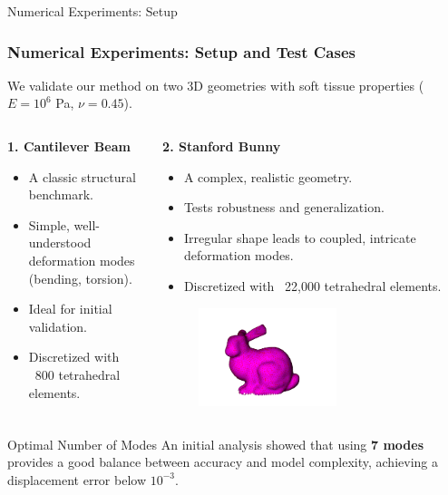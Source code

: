 \documentclass{beamer}
\begin{document}
\begin{frame}{Numerical Experiments: Setup}
    \frametitle{Numerical Experiments: Setup and Test Cases}
    
    We validate our method on two 3D geometries with soft tissue properties ($E = 10^6$ Pa, $\nu = 0.45$).
    
    \begin{columns}[T]
        \begin{column}{0.45\textwidth}
            \textbf{1. Cantilever Beam}
            \begin{itemize}
                \item A classic structural benchmark.
                \item Simple, well-understood deformation modes (bending, torsion).
                \item Ideal for initial validation.
                \item Discretized with ~800 tetrahedral elements.
            \end{itemize}
        \end{column}
        
        \begin{column}{0.55\textwidth}
            \textbf{2. Stanford Bunny} \cite{bunny-mesh}
            \begin{itemize}
                \item A complex, realistic geometry.
                \item Tests robustness and generalization.
                \item Irregular shape leads to coupled, intricate deformation modes.
                \item Discretized with ~22,000 tetrahedral elements.
            \end{itemize}
            \begin{figure}
                \includegraphics[width=0.6\textwidth]{Images/stanford_bunny.png}
            \end{figure}
        \end{column}
    \end{columns}
    
    \begin{alertblock}{Optimal Number of Modes}
        An initial analysis showed that using \textbf{7 modes} provides a good balance between accuracy and model complexity, achieving a displacement error below $10^{-3}$.
    \end{alertblock}
\end{frame}
\end{document}
